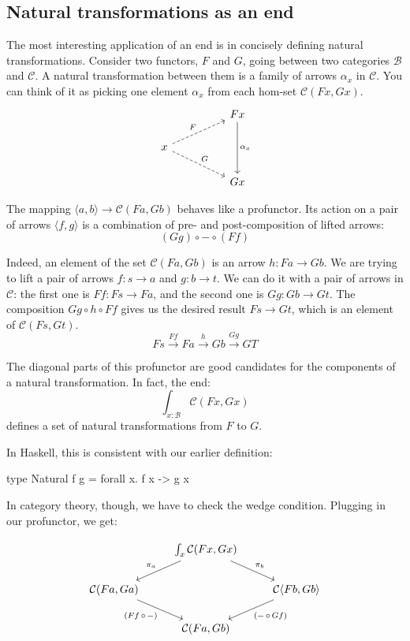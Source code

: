 \documentclass[DaoFP]{subfiles}
\begin{document}
\subsection{Natural transformations as an end}

The most interesting application of an end is in concisely defining natural transformations. Consider two functors, $F$ and $G$, going between two categories  $\mathcal{B}$ and $\mathcal{C}$. A natural transformation between them is a family of arrows $\alpha_x$ in $\mathcal{C}$. You can think of it as picking one element $\alpha_x$ from each hom-set  $\mathcal{C} (F x, G x)$.
\[
 \begin{tikzcd}
 && F x
 \arrow[dd, "\alpha_x"]
 \\
 x
 \arrow[urr, dashed, "F"]
 \arrow[drr, dashed, "G"]
 \\
 && G x
 \end{tikzcd}
\]

The mapping  $\langle a, b \rangle \to \mathcal{C} (F a, G b)$ behaves like a profunctor. Its action on a pair of arrows $\langle f, g \rangle$ is a combination of pre- and post-composition of lifted arrows:
 \[ (G g) \circ - \circ (F f) \]

Indeed, an element of the set $ \mathcal{C} (F a, G b)$ is an arrow $h \colon F a \to G b$. We are trying to lift a pair of arrows $f \colon s \to a$ and $g \colon b \to t$. We can do it with a pair of arrows in $\mathcal{C}$: the first one is $F f \colon F s \to F a$, and the second one is $G g \colon G b \to G t$. The composition $G g \circ h \circ F f$ gives us the desired result $ F s \to G t$, which is an element of $\mathcal{C} (F s, G t)$.
\[ F s \xrightarrow{F f} F a \xrightarrow{h} G b \xrightarrow{G g} GT \]

The diagonal parts of this profunctor are good candidates for the components of a natural transformation. In fact, the end:
\[  \int_{x \colon  \mathcal{B}} \mathcal{C}(F x, G x) \]
defines a set of natural transformations from $F$ to $G$.

In Haskell, this is consistent with our earlier definition:
\begin{haskell}
type Natural f g = forall x. f x -> g x
\end{haskell}

In category theory, though, we have to check the wedge condition. Plugging in our profunctor, we get:

\[
 \begin{tikzcd}
 & \int_{x} \mathcal{C}(F x, G x)
 \arrow[ld, "\pi_a"']
 \arrow[rd, "\pi_b"]
 \\
  \mathcal{C} ( F a, G a )
 \arrow[dr, "{(Ff \, \circ \, -)}"']
 && \mathcal{C} \langle F b, G b \rangle
 \arrow[dl, "{(- \, \circ\, Gf)}"]
 \\
 &  \mathcal{C} ( F a, G b )
 \end{tikzcd}
\]
\end{document}

